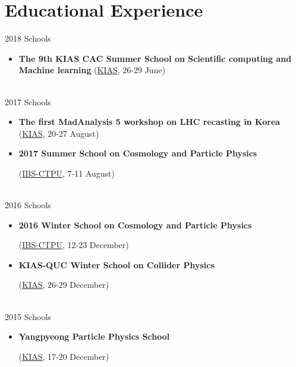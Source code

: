 \documentclass[letterpaper]{twentysecondcv} %
\begin{document}
\section{Educational Experience}
\begin{twenty}
    \twentyitem
        {2018}
        {}
        {Schools}
        {}
        {}
        {\begin{itemize}
        \item \textbf{The 9th KIAS CAC Summer School on Scientific computing and Machine learning} (\href{http://www.kias.re.kr/}{KIAS}, 26-29 June)
        \end{itemize}}
    \\
    \twentyitem
        {2017}
        {}
        {Schools}
        {}
        {}
        {\begin{itemize}
        \item \textbf{The first MadAnalysis 5 workshop on LHC recasting in Korea}
        (\href{https://indico.cern.ch/event/637941/overview}{KIAS}, 20-27 August)
        
        \item \textbf{2017 Summer School on Cosmology and Particle Physics}
        
        (\href{https://indico.ibs.re.kr/event/153/}{IBS-CTPU}, 7-11 August)
        \end{itemize}
        }
    \\
    \twentyitem
        {2016}
        {}
        {Schools}
        {}
        {}
        {\begin{itemize}
        \item \textbf{2016 Winter School on Cosmology and Particle Physics}
        
        (\href{https://indico.ibs.re.kr/event/97/}{IBS-CTPU}, 12-23 December)
        
        \item \textbf{KIAS-QUC Winter School on Collider Physics}
        
        (\href{http://home.kias.re.kr/MKG/h/WSCP/?pageNo=2548}{KIAS}, 26-29 December)
        \end{itemize}}
    \\
    \twentyitem
        {2015}
        {}
        {Schools}
        {}
        {}
        {\begin{itemize}
        \item \textbf{Yangpyeong Particle Physics School}
        
        (\href{http://home.kias.re.kr/MKG/h/YPschool2015/?pageNo=1717}{KIAS}, 17-20 December)
        \end{itemize}
        }
    \\
\end{twenty}
\end{document}
